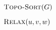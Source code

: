 
\begin{algorithm}[H]
  \begin{algorithmic}[1]
      \State {}

      \hStatex
      \State $\Call{Topo-Sort}{G}$

      \hStatex
	  \State $\Call{Relax}{u, v, w}$
	\EndFor
      \EndFor
    \EndProcedure
  \end{algorithmic}
\end{algorithm}
